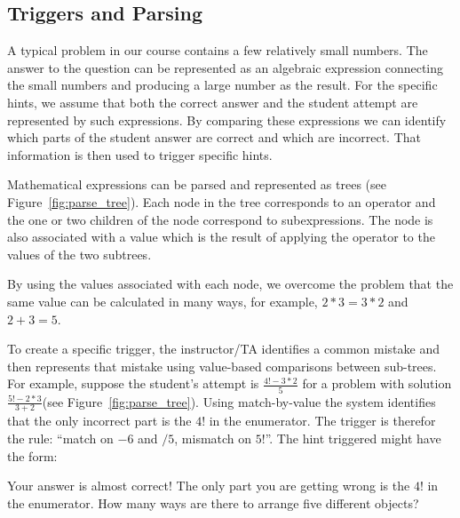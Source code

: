 \documentclass{llncs2e/llncs}
\begin{document}
\subsection*{Triggers and Parsing}

A typical problem in our course contains a few relatively small
numbers. The answer to the question can be represented as an algebraic
expression connecting the small numbers and producing a large number
as the result. For the specific hints, we assume that both the correct
answer and the student attempt are represented by such expressions. By
comparing these expressions we can identify which parts of the student
answer are correct and which are incorrect. That information is then
used to trigger specific hints.

Mathematical expressions can be parsed and represented as trees (see Figure~\ref{fig:parse_tree}). Each node in the tree corresponds to an operator and the one or two children of the node correspond to subexpressions. The node is also associated with a value which is the result of applying the operator to the values of the two subtrees.

By using the values associated with each node, we overcome the problem that the same value can be calculated in many ways, for example, $2*3 = 3*2$ and $2+3=5$. 

To create a specific trigger, the instructor/TA identifies a common
mistake and then represents that mistake using value-based comparisons between sub-trees. For example,
suppose the student's attempt is $\frac{4!-3*2}{5}$
for a problem with solution $\frac{5!-2*3}{3+2}$(see Figure~\ref{fig:parse_tree}). Using match-by-value the system identifies that the only incorrect part is the $4!$ in the enumerator. The trigger is therefor the rule: ``match on $-6$ and $/5$, mismatch on $5!$''. The hint triggered might have the form:
\begin{displayquote}
Your answer is almost correct! The only part you are getting wrong is
the $4!$ in the enumerator. How many ways are there to arrange five different objects?
\end{displayquote}
\end{document}
